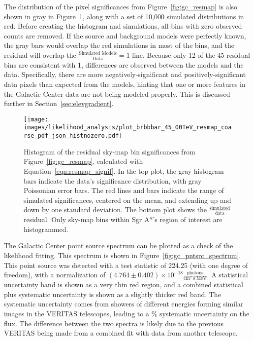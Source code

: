 The distribution of the pixel significances from Figure~\ref{fig:gc_resmap} is also shown in gray in Figure~\ref{fig:gc_resmap_sighist_coarse}, along with a set of 10,000 simulated distributions in red.
Before creating the histogram and simulations, all bins with zero observed counts are removed.
If the source and background models were perfectly known, the gray bars would overlap the red simulations in most of the bins, and the residual will overlap the ${\frac{\textrm{Simulated Models}}{\textrm{Data}}=1}$ line.
Because only 12 of the 45 residual bins are consistent with 1, differences are observed between the models and the data.
Specifically, there are more negatively-significant and positively-significant data pixels than expected from the models, hinting that one or more features in the Galactic Center data are not being modeled properly.
This is discussed further in Section~\ref{sec:elevgradient}.

\begin{figure}[ht]
  \centering
  \texttt{[image: images/likelihood\_analysis/plot\_brbbbar\_45\_00TeV\_resmap\_coarse\_pdf\_json\_histnozero.pdf]}
  \caption[Galactic Center Residual Histogram]
  {
    Histogram of the residual sky-map bin significances from Figure~\ref{fig:gc_resmap}, calculated with Equation~\ref{eqn:resmap_signif}.
    In the top plot, the gray histogram bars indicate the data’s significance distribution, with gray Poissonian error bars.
     The red lines and bars indicate the range of simulated significances, centered on the mean, and extending up and down by one standard deviation.
    The bottom plot shows the $\frac{\textrm{simulated}}{\textrm{data}}$ residual.
    Only sky-map bins within Sgr A*'s region of interest are histogrammed.
  }
  \label{fig:gc_resmap_sighist_coarse}
\end{figure}

The Galactic Center point source spectrum can be plotted as a check of the likelihood fitting.
This spectrum is shown in Figure~\ref{fig:gc_pntsrc_spectrum}.
This point source was detected with a test statistic of 224.25 (with one degree of freedom), with a normalization of $(4.764\pm0.402)\times 10^{-18} \frac{\textrm{photons}}{\textrm{cm}^2\;\textrm{s}\;\textrm{MeV}}$.
A statistical uncertainty band is shown as a very thin red region, and a combined statistical plus systematic uncertainty is shown as a slightly thicker red band.
The systematic uncertainty comes from showers of different energies forming similar images in the VERITAS telescopes, leading to a \% systematic uncertainty on the flux.
The difference between the two spectra is likely due to the previous VERITAS being made from a combined fit with data from another telescope.

